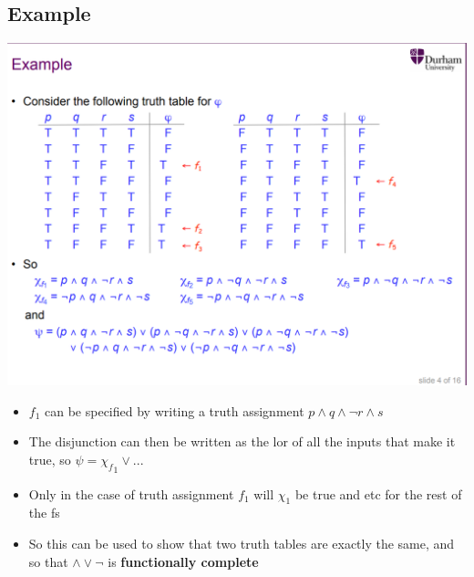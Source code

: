 \documentclass{article}[18pt]
\begin{document}
\subsection{Example}
\includegraphics[width=\textwidth]{Fig1.png}
\begin{itemize}
\item $f_1$ can be specified by writing a truth assignment $p\land q\land \lnot r \land s$ 
\item The disjunction can then be written as the lor of all the inputs that make it true, so $\psi={\chi_f}_1\lor...$
\item Only in the case of truth assignment $f_1$ will $\chi_1$ be true and etc for the rest of the fs
\item So this can be used to show that two truth tables are exactly the same, and so that $\land \lor \lnot$ is \textbf{functionally complete}
\end{itemize}
\end{document}

